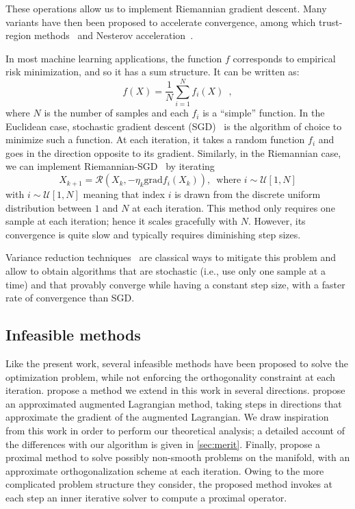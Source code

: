 \documentclass[twoside,11pt]{article}
\newcommand{\grad}{{\mathrm{grad}}}
\newcommand{\finalrevision}[1]{{#1}}
\begin{document}
These operations allow us to implement Riemannian gradient descent. Many variants have then been proposed to accelerate convergence, among which trust-region
%
methods~\citep{absil2007trust} and Nesterov acceleration~\citep{ahn2020nesterov}.
%
%

In most machine learning applications, the function $f$ corresponds to empirical risk minimization, and so it has a sum structure. It can be written as:
\begin{equation}
  \label{eq:erm}
  f(X) = \frac1N\sum_{i=1}^Nf_i(X)\enspace,
\end{equation}
where $N$ is the number of samples and each $f_i$ is a ``simple'' function. In the Euclidean case, stochastic gradient descent
%
(SGD)~\citep{robbins1951stochastic} is the algorithm of choice to minimize such a function. At each iteration, it takes a random function $f_i$ and goes in the direction opposite to its gradient. Similarly, in the Riemannian case, we can implement Riemannian-SGD~\citep{bonnabel2013stochastic} by iterating
\begin{equation}
  \label{eq:sgd}
  X_{k+1} = \mathcal{R}(X_k, -\eta_k\grad f_i(X_k)),\enspace \text{where } i \sim \mathcal{U}[1, N] 
\end{equation}
with $i \sim \mathcal{U}[1, N] $ meaning that index $i$ is drawn from the discrete uniform distribution between $1$ and $N$ at each iteration. 
%
This method only requires one sample at each iteration; hence it scales gracefully with $N$. However, its convergence is quite slow and typically requires diminishing step sizes.

Variance reduction techniques~\citep{johnson2013accelerating, schmidt2017minimizing, defazio2014saga} are classical ways to mitigate this problem and allow to obtain algorithms that are stochastic (i.e.,
use only one sample at a time) and
that provably converge while having a constant step size, with a faster rate of convergence than SGD.

\finalrevision{
    \subsection{Infeasible methods}
    Like the present work, several infeasible methods have been proposed to solve the optimization problem, while not enforcing the orthogonality constraint at each iteration. 
    \citet{ablin2018faster} propose a method we extend in this work in several directions. 
    \citet{gao2019parallelizable} propose an approximated augmented Lagrangian method, taking steps in directions that approximate the gradient of the augmented Lagrangian. 
    We draw inspiration from this work in order to perform our theoretical analysis; a detailed account of the differences with our algorithm is given in \autoref{sec:merit}.
    Finally, \citet{liu2024penalty} propose a proximal method to solve possibly non-smooth problems on the manifold, with an approximate orthogonalization scheme at each iteration. 
    Owing to the more complicated problem structure they consider, the proposed method invokes at each step an inner iterative solver to compute a proximal operator.
}
\end{document}
